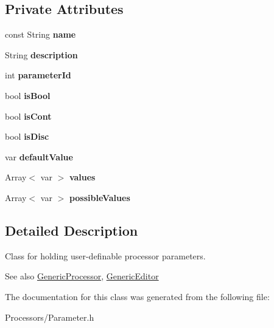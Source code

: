 \subsection*{Private Attributes}
\begin{DoxyCompactItemize}
\item 
\hypertarget{classParameter_a18c92c8190d681c49fc6ff60f94245b6}{const String {\bfseries name}}\label{classParameter_a18c92c8190d681c49fc6ff60f94245b6}

\item 
\hypertarget{classParameter_a5aacdf5c58652cc6840ebfbe2a748d29}{String {\bfseries description}}\label{classParameter_a5aacdf5c58652cc6840ebfbe2a748d29}

\item 
\hypertarget{classParameter_ab06e79287bec9288210c65cd6f623851}{int {\bfseries parameter\-Id}}\label{classParameter_ab06e79287bec9288210c65cd6f623851}

\item 
\hypertarget{classParameter_a5006ffe49af0534876d7e6e1fc63d1db}{bool {\bfseries is\-Bool}}\label{classParameter_a5006ffe49af0534876d7e6e1fc63d1db}

\item 
\hypertarget{classParameter_a33f6f455be804dbc9743d7b9124bc1e4}{bool {\bfseries is\-Cont}}\label{classParameter_a33f6f455be804dbc9743d7b9124bc1e4}

\item 
\hypertarget{classParameter_afceec950c5fa0b6968dd87bc6a652740}{bool {\bfseries is\-Disc}}\label{classParameter_afceec950c5fa0b6968dd87bc6a652740}

\item 
\hypertarget{classParameter_a7876f41120778114b3c61671e8531c05}{var {\bfseries default\-Value}}\label{classParameter_a7876f41120778114b3c61671e8531c05}

\item 
\hypertarget{classParameter_a75745989a25c8ef2b3c6d25bc22963c4}{Array$<$ var $>$ {\bfseries values}}\label{classParameter_a75745989a25c8ef2b3c6d25bc22963c4}

\item 
\hypertarget{classParameter_a67fc656af78ffe47e4cdefc99bc21e91}{Array$<$ var $>$ {\bfseries possible\-Values}}\label{classParameter_a67fc656af78ffe47e4cdefc99bc21e91}

\end{DoxyCompactItemize}


\subsection{Detailed Description}
Class for holding user-\/definable processor parameters.

\begin{DoxySeeAlso}{See also}
\hyperlink{classGenericProcessor}{Generic\-Processor}, \hyperlink{classGenericEditor}{Generic\-Editor} 
\end{DoxySeeAlso}


The documentation for this class was generated from the following file\-:\begin{DoxyCompactItemize}
\item 
Processors/Parameter.\-h\end{DoxyCompactItemize}
